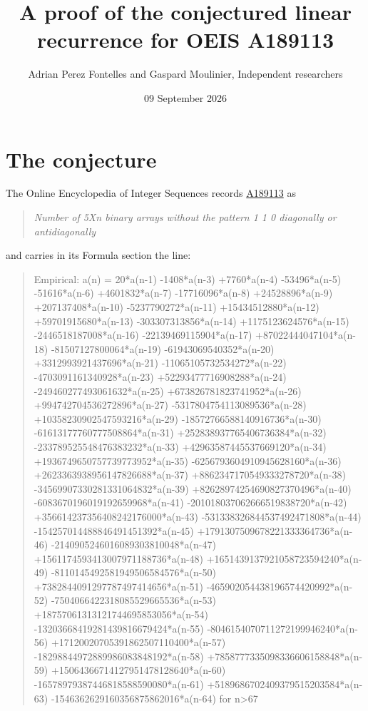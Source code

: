 \documentclass[11pt]{article}
\title{A proof of the conjectured linear recurrence for OEIS A189113}
\author{Adrian Perez Fontelles and Gaspard Moulinier, Independent researchers}
\date{09 September 2026}
\theoremstyle{definition}
\begin{document}
\maketitle
\section{The conjecture}

The Online Encyclopedia of Integer Sequences records \href{https://oeis.org/A189113}{A189113} as

\begin{quote}\itshape Number of 5Xn binary arrays without the pattern 1 1 0 diagonally or antidiagonally\end{quote}

and carries in its Formula section the line:

\begin{quote}\ttfamily Empirical: a(n) = 20*a(n-1) -1408*a(n-3) +7760*a(n-4) -53496*a(n-5) -51616*a(n-6) +4601832*a(n-7) -17716096*a(n-8) +24528896*a(n-9) +207137408*a(n-10) -5237790272*a(n-11) +15434512880*a(n-12) +59701915680*a(n-13) -303307313856*a(n-14) +1175123624576*a(n-15) -2446518187008*a(n-16) -22139469115904*a(n-17) +87022444047104*a(n-18) -81507127800064*a(n-19) -61943069540352*a(n-20) +3312993921437696*a(n-21) -11065105732534272*a(n-22) -4703091161340928*a(n-23) +52293477716908288*a(n-24) -249460277493061632*a(n-25) +673826781823741952*a(n-26) +994742704536272896*a(n-27) -5317804754113089536*a(n-28) +10358230902547593216*a(n-29) -18572766588140916736*a(n-30) -61613177760777508864*a(n-31) +252838937765406736384*a(n-32) -233789525548476383232*a(n-33) +42963587445537669120*a(n-34) +1936749650757739773952*a(n-35) -6256793604910945628160*a(n-36) +2623363938956147826688*a(n-37) +8862347170549333278720*a(n-38) -34569907330281331064832*a(n-39) +82628974254690827370496*a(n-40) -6083670196019192659968*a(n-41) -201018037062666519838720*a(n-42) +356614237356408242176000*a(n-43) -531338326844537492471808*a(n-44) -154257014488846491451392*a(n-45) +1791307509678221333364736*a(n-46) -2140905246016089303810048*a(n-47) +1561174593413007971188736*a(n-48) +1651439137921058723594240*a(n-49) -8110145492581949506584576*a(n-50) +7382844091297787497414656*a(n-51) -465902054438196574420992*a(n-52) -7504066422318085529665536*a(n-53) +18757061313121744695853056*a(n-54) -13203668419281439816679424*a(n-55) -8046154070711272199946240*a(n-56) +17120020705391862507110400*a(n-57) -18298844972889986083848192*a(n-58) +7858777335098336606158848*a(n-59) +15064366714127951478128640*a(n-60) -16578979387446818588590080*a(n-61) +5189686702409379515203584*a(n-63) -1546362629160356875862016*a(n-64) for n>67\end{quote}
\end{document}
